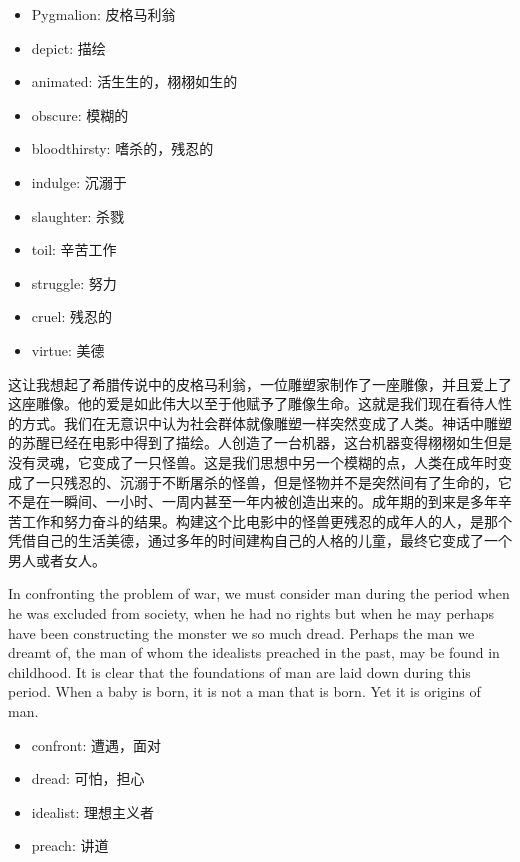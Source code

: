 \documentclass[lang=cn,10pt]{elegantbook}
\begin{document}
\begin{tcolorbox}
    \begin{itemize}
        \item Pygmalion: 皮格马利翁
        \item depict: 描绘
        \item animated: 活生生的，栩栩如生的
        \item obscure: 模糊的
        \item bloodthirsty: 嗜杀的，残忍的
        \item indulge: 沉溺于
        \item slaughter: 杀戮
        \item toil: 辛苦工作
        \item struggle: 努力
        \item cruel: 残忍的
        \item virtue: 美德
    \end{itemize}
\end{tcolorbox}

这让我想起了希腊传说中的皮格马利翁，一位雕塑家制作了一座雕像，并且爱上了这座雕像。他的爱是如此伟大以至于他赋予了雕像生命。这就是我们现在看待人性的方式。我们在无意识中认为社会群体就像雕塑一样突然变成了人类。神话中雕塑的苏醒已经在电影中得到了描绘。人创造了一台机器，这台机器变得栩栩如生但是没有灵魂，它变成了一只怪兽。这是我们思想中另一个模糊的点，人类在成年时变成了一只残忍的、沉溺于不断屠杀的怪兽，但是怪物并不是突然间有了生命的，它不是在一瞬间、一小时、一周内甚至一年内被创造出来的。成年期的到来是多年辛苦工作和努力奋斗的结果。构建这个比电影中的怪兽更残忍的成年人的人，是那个凭借自己的生活美德，通过多年的时间建构自己的人格的儿童，最终它变成了一个男人或者女人。

In confronting the problem of war, we must consider man during the period when he was excluded from society, when he had no rights but when he may perhaps have been constructing the monster we so much dread. Perhaps the man we dreamt of, the man of whom the idealists preached in the past, may be found in childhood. It is clear that the foundations of man are laid down during this period. When a baby is born, it is not a man that is born. Yet it is origins of man.

\begin{tcolorbox}
    \begin{itemize}
        \item confront: 遭遇，面对
        \item dread: 可怕，担心
        \item idealist: 理想主义者
        \item preach: 讲道
    \end{itemize}
\end{tcolorbox}
\end{document}
